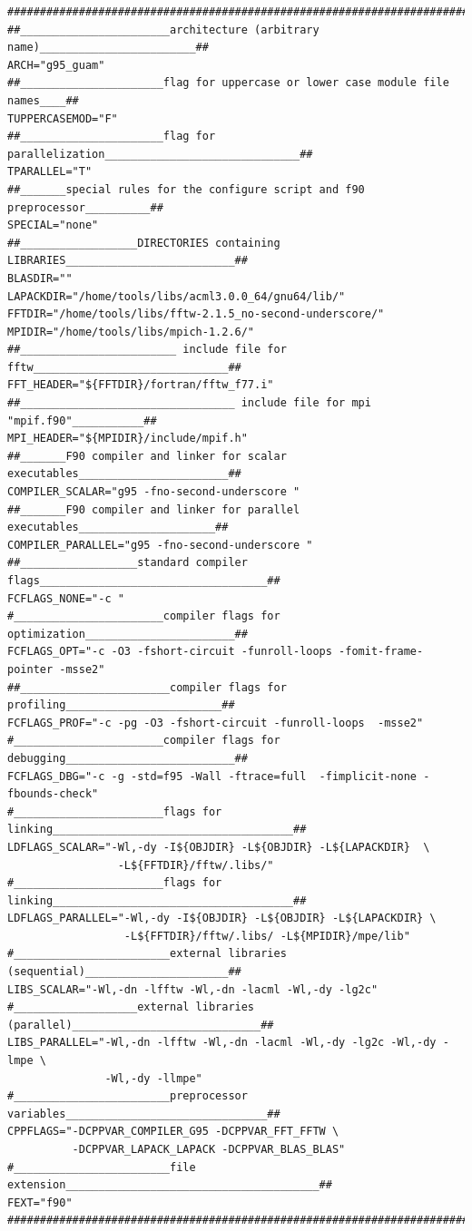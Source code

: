 \documentclass[a4paper,10pt]{report}
\begin{document}
\begin{verbatim}
################################################################################
##_______________________architecture (arbitrary name)________________________##
ARCH="g95_guam"
##______________________flag for uppercase or lower case module file names____##
TUPPERCASEMOD="F"
##______________________flag for parallelization______________________________##
TPARALLEL="T"
##_______special rules for the configure script and f90 preprocessor__________##
SPECIAL="none"
##__________________DIRECTORIES containing LIBRARIES__________________________##
BLASDIR=""
LAPACKDIR="/home/tools/libs/acml3.0.0_64/gnu64/lib/"
FFTDIR="/home/tools/libs/fftw-2.1.5_no-second-underscore/"
MPIDIR="/home/tools/libs/mpich-1.2.6/"
##________________________ include file for fftw______________________________##
FFT_HEADER="${FFTDIR}/fortran/fftw_f77.i"
##_________________________________ include file for mpi "mpif.f90"___________##
MPI_HEADER="${MPIDIR}/include/mpif.h"
##_______F90 compiler and linker for scalar executables_______________________##
COMPILER_SCALAR="g95 -fno-second-underscore "
##_______F90 compiler and linker for parallel executables_____________________##
COMPILER_PARALLEL="g95 -fno-second-underscore "
##__________________standard compiler flags___________________________________##
FCFLAGS_NONE="-c "
#_______________________compiler flags for optimization_______________________##
FCFLAGS_OPT="-c -O3 -fshort-circuit -funroll-loops -fomit-frame-pointer -msse2"
##_______________________compiler flags for  profiling________________________##
FCFLAGS_PROF="-c -pg -O3 -fshort-circuit -funroll-loops  -msse2"
#_______________________compiler flags for debugging__________________________##
FCFLAGS_DBG="-c -g -std=f95 -Wall -ftrace=full  -fimplicit-none -fbounds-check"
#_______________________flags for linking_____________________________________##
LDFLAGS_SCALAR="-Wl,-dy -I${OBJDIR} -L${OBJDIR} -L${LAPACKDIR}  \
                 -L${FFTDIR}/fftw/.libs/"
#_______________________flags for linking_____________________________________##
LDFLAGS_PARALLEL="-Wl,-dy -I${OBJDIR} -L${OBJDIR} -L${LAPACKDIR} \
                  -L${FFTDIR}/fftw/.libs/ -L${MPIDIR}/mpe/lib"
#________________________external libraries (sequential)______________________##
LIBS_SCALAR="-Wl,-dn -lfftw -Wl,-dn -lacml -Wl,-dy -lg2c"
#___________________external libraries (parallel)_____________________________##
LIBS_PARALLEL="-Wl,-dn -lfftw -Wl,-dn -lacml -Wl,-dy -lg2c -Wl,-dy -lmpe \
               -Wl,-dy -llmpe"
#________________________preprocessor variables_______________________________##
CPPFLAGS="-DCPPVAR_COMPILER_G95 -DCPPVAR_FFT_FFTW \
          -DCPPVAR_LAPACK_LAPACK -DCPPVAR_BLAS_BLAS"
#________________________file extension_______________________________________## 
FEXT="f90"
################################################################################
\end{verbatim}
\end{document}
